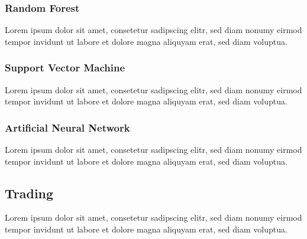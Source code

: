 \subsubsection{Random Forest}
Lorem ipsum dolor sit amet, consetetur sadipscing elitr, sed diam nonumy eirmod tempor invidunt ut labore et dolore magna aliquyam erat, sed diam voluptua.

\subsubsection{Support Vector Machine}
Lorem ipsum dolor sit amet, consetetur sadipscing elitr, sed diam nonumy eirmod tempor invidunt ut labore et dolore magna aliquyam erat, sed diam voluptua.

\subsubsection{Artificial Neural Network}
Lorem ipsum dolor sit amet, consetetur sadipscing elitr, sed diam nonumy eirmod tempor invidunt ut labore et dolore magna aliquyam erat, sed diam voluptua.


\subsection{Trading}
Lorem ipsum dolor sit amet, consetetur sadipscing elitr, sed diam nonumy eirmod tempor invidunt ut labore et dolore magna aliquyam erat, sed diam voluptua.

